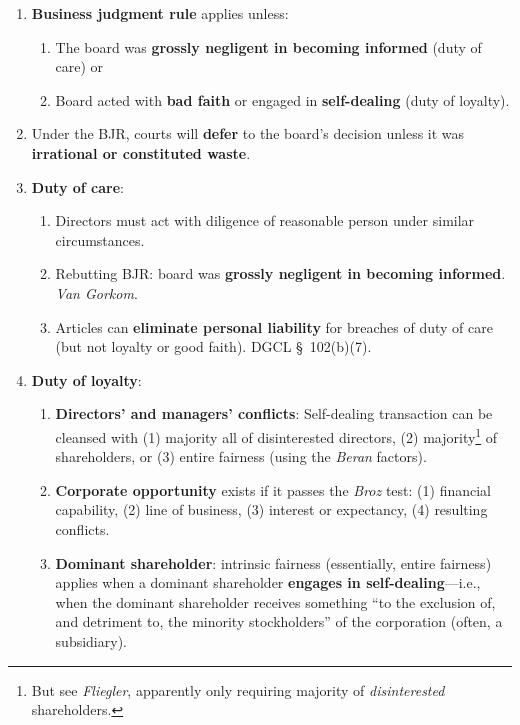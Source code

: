 \begin{enumerate}
    \item \textbf{Business judgment rule} applies unless:
    \begin{enumerate}
        \item The board was \textbf{grossly negligent in becoming informed} (duty of care) or 
        \item Board acted with \textbf{bad faith} or engaged in 
        \textbf{self-dealing} (duty of loyalty).
    \end{enumerate}
    \item Under the BJR, courts will \textbf{defer} to the board's decision 
    unless it was \textbf{irrational or constituted waste}.
    \item \textbf{Duty of care}:
    \begin{enumerate}
        \item Directors must act with diligence of reasonable person under 
        similar circumstances.
        \item Rebutting BJR: board was \textbf{grossly negligent in becoming 
        informed}. \emph{Van Gorkom}.
        \item Articles can \textbf{eliminate personal liability} for breaches 
        of duty of care (but not loyalty or good faith). DGCL \S\ 102(b)(7).
    \end{enumerate}
    \item \textbf{Duty of loyalty}:
    \begin{enumerate}
        \item \textbf{Directors' and managers' conflicts}: Self-dealing 
        transaction can be cleansed with (1) majority all of disinterested 
        directors, (2) majority\footnote{But see \emph{Fliegler}, apparently 
        only requiring majority of \emph{disinterested} shareholders.} of 
        shareholders, or (3) entire fairness (using the \emph{Beran} factors).
        \item \textbf{Corporate opportunity} exists if it passes the 
        \emph{Broz} test: (1) financial capability, (2) line of business, (3) 
        interest or expectancy, (4) resulting conflicts.
        \item \textbf{Dominant shareholder}: intrinsic fairness (essentially, 
        entire fairness) applies when a dominant shareholder \textbf{engages 
        in self-dealing}---i.e., when the dominant shareholder receives 
        something ``to the exclusion of, and detriment to, the minority 
        stockholders'' of the corporation (often, a subsidiary).  

\end{enumerate}
\end{enumerate}
